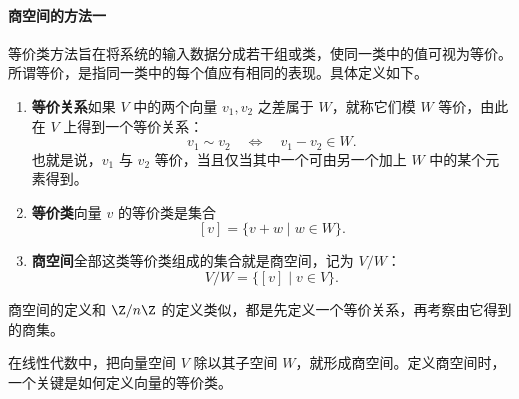 \paragraph{商空间的方法一}
等价类方法旨在将系统的输入数据分成若干组或类，使同一类中的值可视为等价。所谓等价，是指同一类中的每个值应有相同的表现。具体定义如下。
\begin{enumerate}
  \item \textbf{等价关系}\quad 如果 $V$ 中的两个向量 $v_1,v_2$ 之差属于 $W$，就称它们模 $W$ 等价，由此在 $V$ 上得到一个等价关系：
  \[
    v_1\sim v_2\quad\Longleftrightarrow\quad v_1-v_2\in W.
  \]
  也就是说，$v_1$ 与 $v_2$ 等价，当且仅当其中一个可由另一个加上 $W$ 中的某个元素得到。
  \item \textbf{等价类}\quad 向量 $v$ 的等价类是集合
  \[
    [v]=\{v+w\mid w\in W\}.
  \]
  \item \textbf{商空间}\quad 全部这类等价类组成的集合就是商空间，记为 $V/W$：
  \[
    V/W=\{[v]\mid v\in V\}.
  \]
\end{enumerate}
商空间的定义和 $\Z/n\Z$ 的定义类似，都是先定义一个等价关系，再考察由它得到的商集。

在线性代数中，把向量空间 $V$ 除以其子空间 $W$，就形成商空间。定义商空间时，一个关键是如何定义向量的等价类。

